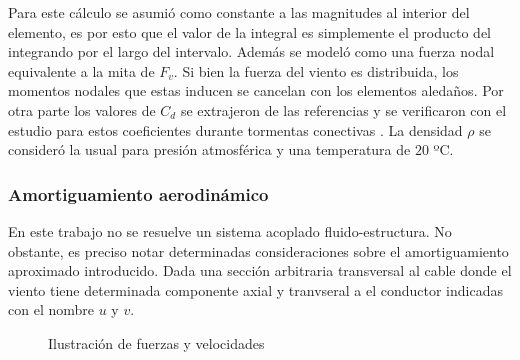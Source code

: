 Para este cálculo se asumió como constante a las magnitudes al interior del elemento, es por esto que el valor de la integral es simplemente el producto del integrando por el largo del intervalo. Además se modeló como una fuerza nodal equivalente a la mita de $F_v$. Si bien la fuerza del viento es distribuida, los momentos nodales que estas inducen se cancelan con los elementos aledaños. Por otra parte los valores de $C_d$ se extrajeron de las referencias \citep{Foti2016} y se verificaron con el estudio para estos coeficientes durante tormentas conectivas \citep{mara2007effects}. La densidad $\rho$ se consideró la usual para presión atmosférica y una temperatura de $20$ ºC.

\subsubsection{Amortiguamiento aerodinámico}
 En este trabajo no se resuelve un sistema acoplado fluido-estructura. No obstante, es preciso notar determinadas consideraciones sobre el amortiguamiento aproximado introducido. Dada una sección arbitraria transversal al cable donde el viento tiene determinada componente axial y tranvseral a el conductor indicadas con el nombre $u$ y $v$.  

\begingroup
\begin{figure}[htbp]
	\centering
	\subfigure[[Esquema en sistema de referencias relativo. ]{	\def\svgwidth{80mm}
		}\label{fig:MET:Viento:FuerzaZY}
	\label{fig:MET:Viento:VelRel}
	\caption{Ilustración de fuerzas y velocidades} 	\label{fig:Met:Viento:EsquemasAmort}
\end{figure}
\endgroup
